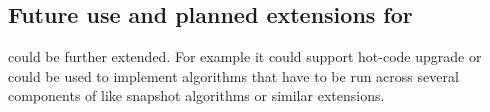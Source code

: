 \subsection{\texorpdfstring{Future use and planned extensions for }
             {Future use and planned extensions for gen\_component}}

 could be further extended. For example it could
support hot-code upgrade or could be used to implement algorithms that
have to be run across several components of \scalaris{} like snapshot
algorithms or similar extensions.





